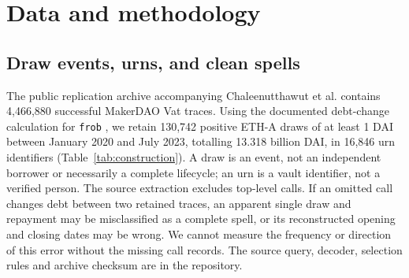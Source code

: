 \documentclass[sn-vancouver,Numbered]{sn-jnl}
\begin{document}
\section{Data and methodology}
\subsection{Draw events, urns, and clean spells}
The public replication archive accompanying Chaleenutthawut et al. \cite{Chaleenutthawut2024} contains 4,466,880 successful MakerDAO Vat traces. Using the documented debt-change calculation for \texttt{frob} \cite{MakerVatDocs}, we retain 130,742 positive ETH-A draws of at least 1 DAI between January 2020 and July 2023, totalling 13.318 billion DAI, in 16,846 urn identifiers (Table~\ref{tab:construction}). A draw is an event, not an independent borrower or necessarily a complete lifecycle; an urn is a vault identifier, not a verified person. The source extraction excludes top-level calls. If an omitted call changes debt between two retained traces, an apparent single draw and repayment may be misclassified as a complete spell, or its reconstructed opening and closing dates may be wrong. We cannot measure the frequency or direction of this error without the missing call records. The source query, decoder, selection rules and archive checksum are in the repository.
\end{document}
